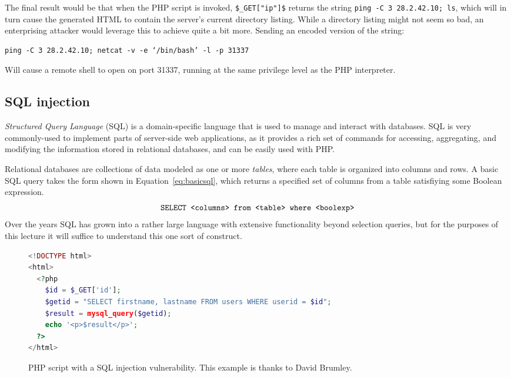\documentclass[11pt,twoside]{scrartcl}
\begin{document}
The final result would be that when the PHP script is invoked, \verb'$_GET["ip"]$' returns the string \verb'ping -C 3 28.2.42.10; ls', which will in turn cause the generated HTML to contain the server's current directory listing. While a directory listing might not seem so bad, an enterprising attacker would leverage this to achieve quite a bit more. Sending an encoded version of the string:
\begin{verbatim}
ping -C 3 28.2.42.10; netcat -v -e ‘/bin/bash’ -l -p 31337
\end{verbatim}
Will cause a remote shell to open on port 31337, running at the same privilege level as the PHP interpreter.

\subsection{SQL injection}

\emph{Structured Query Language} (SQL) is a domain-specific language that is used to manage and interact with databases. SQL is very commonly-used to implement parts of server-side web applications, as it provides a rich set of commands for accessing, aggregating, and modifying the information stored in relational databases, and can be easily used with PHP.

Relational databases are collections of data modeled as one or more \emph{tables}, where each table is organized into columns and rows. A basic SQL query takes the form shown in Equation~\ref{eq:basicsql}, which returns a specified set of columns from a table satisfiying some Boolean expression.
\begin{equation}
\label{eq:basicsql}
\keywordfont{SELECT <columns> from <table> where <boolexp>}
\end{equation}
Over the years SQL has grown into a rather large language with extensive functionality beyond selection queries, but for the purposes of this lecture it will suffice to understand this one sort of construct.

\begin{figure}
\begin{lstlisting}[language=PHP]
<!DOCTYPE html>
<html>
  <?php 
    $id = $_GET['id'];
    $getid = "SELECT firstname, lastname FROM users WHERE userid = $id";
    $result = mysql_query($getid);
    echo '<p>$result</p>';
  ?>
</html>
\end{lstlisting}

\caption{\label{fig:injection2} PHP script with a SQL injection vulnerability. This example is thanks to David Brumley.}
\end{figure}
\end{document}

